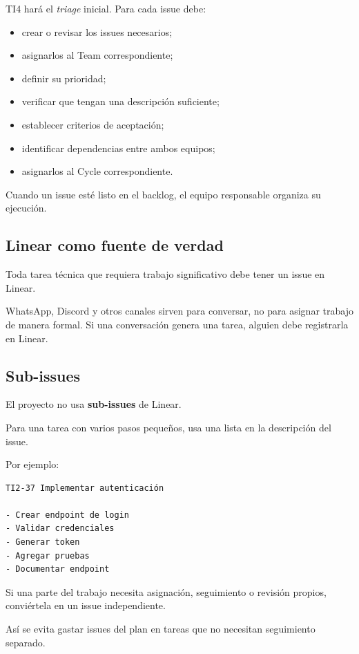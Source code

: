 \documentclass[11pt,a4paper]{article}
\begin{document}
TI4 hará el \textit{triage} inicial. Para cada issue debe:

\begin{itemize}
  \item crear o revisar los issues necesarios;
  \item asignarlos al Team correspondiente;
  \item definir su prioridad;
  \item verificar que tengan una descripción suficiente;
  \item establecer criterios de aceptación;
  \item identificar dependencias entre ambos equipos;
  \item asignarlos al Cycle correspondiente.
\end{itemize}

Cuando un issue esté listo en el backlog, el equipo responsable organiza su
ejecución.

\subsection{Linear como fuente de verdad}

Toda tarea técnica que requiera trabajo significativo debe tener un issue en
Linear.

WhatsApp, Discord y otros canales sirven para conversar, no para asignar trabajo
de manera formal. Si una conversación genera una tarea, alguien debe registrarla
en Linear.

\subsection{Sub-issues}

El proyecto no usa \textbf{sub-issues} de Linear.

Para una tarea con varios pasos pequeños, usa una lista en la descripción del
issue.

Por ejemplo:

\begin{lstlisting}
TI2-37 Implementar autenticación

- Crear endpoint de login
- Validar credenciales
- Generar token
- Agregar pruebas
- Documentar endpoint
\end{lstlisting}

Si una parte del trabajo necesita asignación, seguimiento o revisión propios,
conviértela en un issue independiente.

Así se evita gastar issues del plan en tareas que no necesitan seguimiento
separado.
\end{document}
